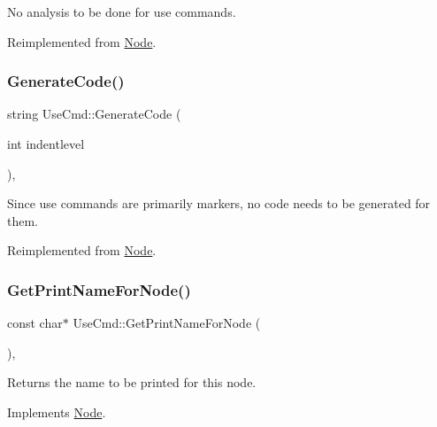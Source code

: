 No analysis to be done for use commands. 

Reimplemented from \hyperlink{class_node_a5f88d55c6f253a29def7ccc443d83d47}{Node}.

\mbox{\label{class_use_cmd_aa8f27d2684e401c1f7c58cdfa7c50696}} 
\subsubsection{\texorpdfstring{Generate\+Code()}{GenerateCode()}}
{\footnotesize\ttfamily string Use\+Cmd\+::\+Generate\+Code (\begin{DoxyParamCaption}\item[{int}]{indentlevel }\end{DoxyParamCaption})\hspace{0.3cm}{\ttfamily [inline]}, {\ttfamily [virtual]}}

Since use commands are primarily markers, no code needs to be generated for them. 

Reimplemented from \hyperlink{class_node_acb60e526730e8436056375a3055c2c32}{Node}.

\mbox{\label{class_use_cmd_af70d8365f4c00d243bd72a336d21c99b}} 
\subsubsection{\texorpdfstring{Get\+Print\+Name\+For\+Node()}{GetPrintNameForNode()}}
{\footnotesize\ttfamily const char$\ast$ Use\+Cmd\+::\+Get\+Print\+Name\+For\+Node (\begin{DoxyParamCaption}{ }\end{DoxyParamCaption})\hspace{0.3cm}{\ttfamily [inline]}, {\ttfamily [virtual]}}

Returns the name to be printed for this node. 

Implements \hyperlink{class_node_a56e29657306ffb004d69c6929ae44269}{Node}.

\mbox{\label{class_use_cmd_ae8b6bad04d432107afa86f5b6ab98db9}} 
